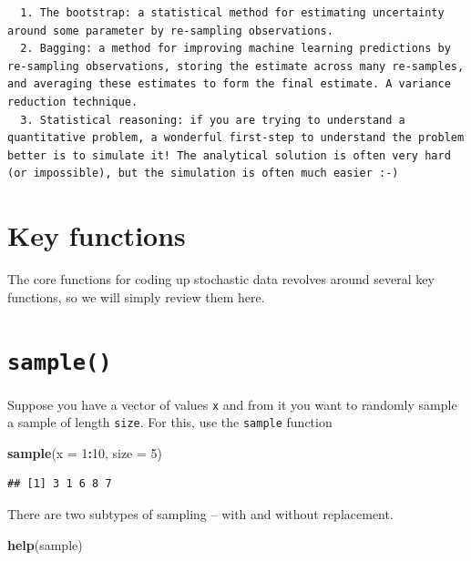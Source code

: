 \documentclass[]{book}
\newenvironment{Shaded}{\begin{snugshade}}{\end{snugshade}}
\newcommand{\KeywordTok}[1]{\textcolor[rgb]{0.13,0.29,0.53}{\textbf{#1}}}
\newcommand{\DataTypeTok}[1]{\textcolor[rgb]{0.13,0.29,0.53}{#1}}
\newcommand{\DecValTok}[1]{\textcolor[rgb]{0.00,0.00,0.81}{#1}}
\newcommand{\OperatorTok}[1]{\textcolor[rgb]{0.81,0.36,0.00}{\textbf{#1}}}
\newcommand{\NormalTok}[1]{#1}
\theoremstyle{definition}
\theoremstyle{definition}
\theoremstyle{definition}
\theoremstyle{remark}
\begin{document}
\begin{verbatim}
  1. The bootstrap: a statistical method for estimating uncertainty around some parameter by re-sampling observations. 
  2. Bagging: a method for improving machine learning predictions by re-sampling observations, storing the estimate across many re-samples, and averaging these estimates to form the final estimate. A variance reduction technique. 
  3. Statistical reasoning: if you are trying to understand a quantitative problem, a wonderful first-step to understand the problem better is to simulate it! The analytical solution is often very hard (or impossible), but the simulation is often much easier :-) 
\end{verbatim}

\section{Key functions}\label{key-functions}

The core functions for coding up stochastic data revolves around several
key functions, so we will simply review them here.

\section{\texorpdfstring{\texttt{sample()}}{sample()}}\label{sample}

Suppose you have a vector of values \texttt{x} and from it you want to
randomly sample a sample of length \texttt{size}. For this, use the
\texttt{sample} function

\begin{Shaded}
\begin{Highlighting}[]
\KeywordTok{sample}\NormalTok{(}\DataTypeTok{x =} \DecValTok{1}\OperatorTok{:}\DecValTok{10}\NormalTok{, }\DataTypeTok{size =} \DecValTok{5}\NormalTok{)}
\end{Highlighting}
\end{Shaded}

\begin{verbatim}
## [1] 3 1 6 8 7
\end{verbatim}

There are two subtypes of sampling -- with and without replacement.

\begin{Shaded}
\begin{Highlighting}[]
\KeywordTok{help}\NormalTok{(sample)}
\end{Highlighting}
\end{Shaded}
\end{document}
